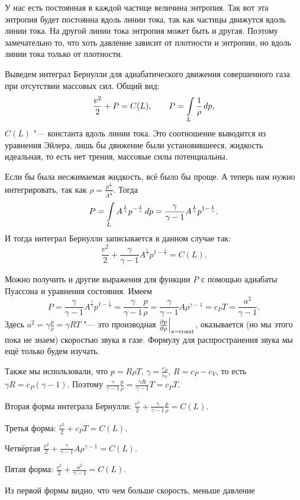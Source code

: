 У нас есть постоянная в каждой частице величина энтропия. Так вот эта энтропия будет постоянна вдоль линии тока, так как частицы движутся вдоль линии тока. На другой линии тока энтропия может быть и другая. Поэтому замечательно то, что хоть давление зависит от плотности и энтропии, но вдоль линии тока только от плотности.

Выведем интеграл Бернулли для адиабатического движения совершенного газа при отсутствии массовых сил. Общий вид:
\begin{equation}
  \frac{v^2}2 + P = C(L),\qquad P =\int\limits_{L}\frac1\rho\,dp,
\end{equation}
$C(L)$ "--- константа вдоль линии тока. Это соотношение выводится из уравнения Эйлера, лишь бы движение были установившееся, жидкость идеальная, то есть нет трения, массовые силы потенциальны.

Если бы была несжимаемая жидкость, всё было бы проще. А теперь нам нужно интегрировать, так как $\rho = \frac{p^{\frac1\gamma}}{A^{\frac1\gamma}}$.
Тогда
\[ P = \int\limits_{L} A^{\frac1\gamma}p^{-\frac1\gamma}\,dp = \frac{\gamma}{\gamma-1}A^{\frac1\gamma}p^{1-\frac1\gamma}.\]
И тогда интеграл Бернулли записывается в данном случае так:
\[ \frac{v^2}2 + \frac{\gamma}{\gamma-1}A^{\frac1\gamma}p^{1-\frac1\gamma} = C(L).\]

Можно получить и другие выражения для функции $P$ с помощью адиабаты Пуассона и уравнения состояния. Имеем
\[ P = \frac{\gamma}{\gamma-1}A^{\frac1\gamma}p^{1-\frac1\gamma} = \frac{\gamma}{\gamma-1}\frac p\rho = \frac{\gamma}{\gamma-1} A \rho^{\gamma-1} = c_PT = \frac{a^2}{\gamma-1}.\]
Здесь $a^2 = \gamma\frac p\rho = \gamma R T$ "--- это производная $\frac{\partial p}{\partial \rho}\Big|_{s=\operatorname{const}}$, оказывается (но мы этого пока не знаем) скоростью звука в газе. Формулу для распространения звука мы ещё только будем изучать.

Также мы использовали, что
$p = R\rho T$, $\gamma = \frac{c_P}{c_V}$, $R = c_P-c_V$, то есть $\gamma R = c_P(\gamma-1)$. Поэтому $\frac{\gamma}{\gamma-1}\frac p\rho = \frac{\gamma R}{\gamma-1}T = c_P T$.

Вторая форма интеграла Бернулли: $\frac{v^2}2+\frac{\gamma}{\gamma-1}\frac p\rho = C(L)$.

Третья форма: $\frac{v^2}2+c_PT = C(L)$.

Четвёртая $\frac{v^2}2+ \frac{\gamma}{\gamma-1}A\rho^{\gamma-1} = C(L)$.

Пятая форма: $\frac{v^2}2+\frac{a^2}{\gamma-1} = C(L)$.


Из первой формы видно, что чем больше скорость, меньше давление

